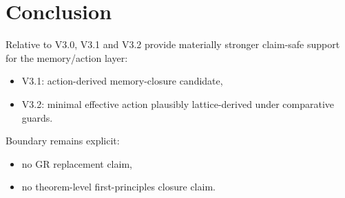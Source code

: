 \documentclass[11pt,a4paper]{article}
\begin{document}
\section{Conclusion}
Relative to V3.0, V3.1 and V3.2 provide materially stronger claim-safe support for the memory/action layer:
\begin{itemize}[leftmargin=1.5em]
\item V3.1: action-derived memory-closure candidate,
\item V3.2: minimal effective action plausibly lattice-derived under comparative guards.
\end{itemize}

\noindent
Boundary remains explicit:
\begin{itemize}[leftmargin=1.5em]
\item no GR replacement claim,
\item no theorem-level first-principles closure claim.
\end{itemize}
\end{document}

